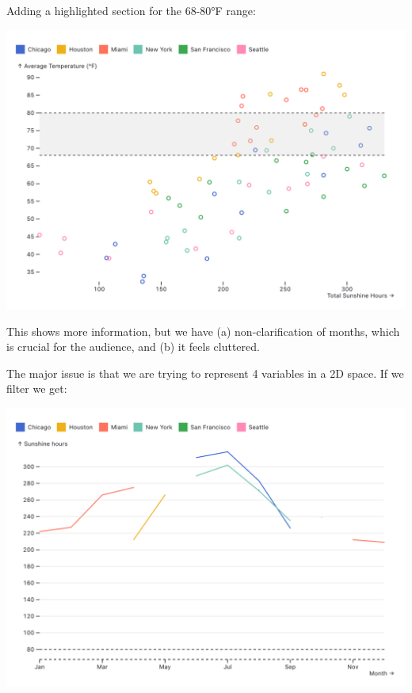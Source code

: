 \documentclass{article}
\begin{document}
\pagebreak

Adding a highlighted section for the 68-80°F range:

\begin{center}
    \includegraphics[scale=0.2]{scatter2.png}
\end{center}

This shows more information, but we have (a) non-clarification of months, which is crucial for the audience, and (b) it feels cluttered.

The major issue is that we are trying to represent 4 variables in a 2D space. 
If we filter we get:

\begin{center}
    \includegraphics[scale=0.2]{line3.png}
\end{center}
\end{document}
